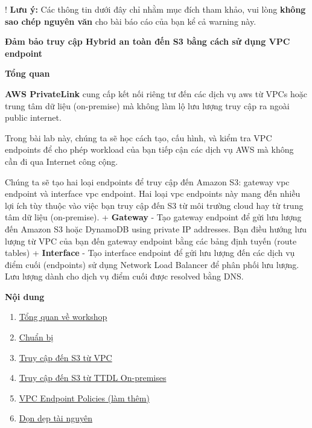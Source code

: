 ! \textbf{Lưu ý:} Các thông tin dưới đây chỉ nhằm mục đích tham khảo,
vui lòng \textbf{không sao chép nguyên văn} cho bài báo cáo của bạn kể
cả warning này.

\vspace{0.5em}\noindent\textbf{Đảm bảo truy cập Hybrid an toàn đến S3 bằng cách sử dụng VPC
endpoint}

\vspace{0.5em}\noindent\textbf{Tổng quan}

\textbf{AWS PrivateLink} cung cấp kết nối riêng tư đến các dịch vụ aws
từ VPCs hoặc trung tâm dữ liệu (on-premise) mà không làm lộ lưu lượng
truy cập ra ngoài public internet.

Trong bài lab này, chúng ta sẽ học cách tạo, cấu hình, và kiểm tra VPC
endpoints để cho phép workload của bạn tiếp cận các dịch vụ AWS mà không
cần đi qua Internet công cộng.

Chúng ta sẽ tạo hai loại endpoints để truy cập đến Amazon S3: gateway
vpc endpoint và interface vpc endpoint. Hai loại vpc endpoints này mang
đến nhiều lợi ích tùy thuộc vào việc bạn truy cập đến S3 từ môi trường
cloud hay từ trung tâm dữ liệu (on-premise). + \textbf{Gateway} - Tạo
gateway endpoint để gửi lưu lượng đến Amazon S3 hoặc DynamoDB using
private IP addresses. Bạn điều hướng lưu lượng từ VPC của bạn đến
gateway endpoint bằng các bảng định tuyến (route tables) +
\textbf{Interface} - Tạo interface endpoint để gửi lưu lượng đến các
dịch vụ điểm cuối (endpoints) sử dụng Network Load Balancer để phân phối
lưu lượng. Lưu lượng dành cho dịch vụ điểm cuối được resolved bằng DNS.

\vspace{0.5em}\noindent\textbf{Nội dung}

\begin{enumerate}
\def\labelenumi{\arabic{enumi}.}
\tightlist
\item
  \href{5.1-Workshop-overview/}{Tổng quan về workshop}
\item
  \href{5.2-Prerequiste/}{Chuẩn bị}
\item
  \href{5.3-S3-vpc/}{Truy cập đến S3 từ VPC}
\item
  \href{5.4-S3-onprem/}{Truy cập đến S3 từ TTDL On-premises}
\item
  \href{5.5-Policy/}{VPC Endpoint Policies (làm thêm)}
\item
  \href{5.6-Cleanup/}{Dọn dẹp tài nguyên}
\end{enumerate}
